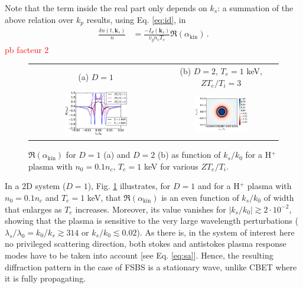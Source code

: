 \documentclass[
 reprint,
 amsmath,amssymb,
 aps,
]{revtex4-1}
\begin{document}
Note that the term inside the real part only depends on $k_s$:   a summation of the above relation over $k_p$ results, using Eq. \eqref{eq:id}, in  
\begin{align}
\frac{ \delta n (t,\mathbf{k}_s ) }{n}  &=   \frac{ -I_d(\mathbf{k}_s) }{ v_g n_c T_e } 
 \Re \left( \alpha_\mathrm{kin}   \right)  
 \, .\label{eq:drakef}
\end{align}
\textcolor{red}{pb facteur 2}
\begin{figure}
\begin{tabular}{cc}
(a) $D=1$&
(b) $D=2$, $T_e=1$ keV, $ZT_e/T_i=3$\\
\includegraphics[width=0.49\textwidth]{akin.eps}&
\includegraphics[width=0.49\textwidth]{akinD2.png}
\end{tabular}
\caption{ \label{fig:akin}  
 $\Re \left( \alpha_\mathrm{kin}   \right)$ for $D=1$ (a) and $D=2$ (b) as function of $k_s/k_0$ for a H$^{+}$ plasma with $n_0=0.1n_c$, $T_e =1$ keV for various $ZT_e/T_i$. 
 }
\end{figure}
In a 2D system ($D=1$), Fig. \ref{fig:akin} illustrates, for $D=1$ and for  a H$^{+}$ plasma with $n_0=0.1n_c$ and  $T_e =1$ keV, that $\Re \left( \alpha_\mathrm{kin}   \right)$ is an even function  of $k_s/k_0$ of width that enlarges as  $T_e$ increases. Moreover, its value vanishes for $\vert k_s/k_0 \vert  \gtrsim 2 \cdot 10^{-2}$, showing that the plasma is sensitive  to the very large wavelength perturbations ($\lambda_s/\lambda_0=k_0/k_s\gtrsim 314 $ or $k_s/k_0\lesssim 0.02$).
As there is, in  the system of interest here no privileged scattering direction, both stokes and antistokes plasma response modes have to be taken into account [see Eq. \eqref{eq:sa}]. Hence,  the resulting diffraction pattern  in the case of FSBS is  a stationary  wave, unlike CBET where it is fully propagating.
\end{document}
